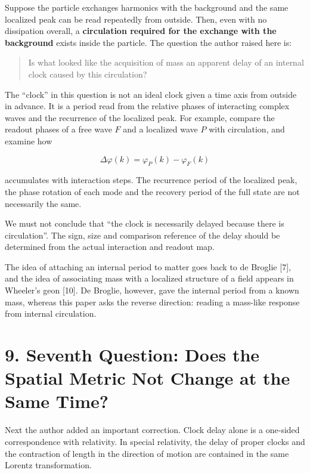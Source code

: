 \documentclass[
  a4paper,
]{article}
\begin{document}
Suppose the particle exchanges harmonics with the background and the
same localized peak can be read repeatedly from outside. Then, even with
no dissipation overall, a \textbf{circulation required for the exchange
with the background} exists inside the particle. The question the author
raised here is:

\begin{quote}
Is what looked like the acquisition of mass an apparent delay of an
internal clock caused by this circulation?
\end{quote}

The ``clock'' in this question is not an ideal clock given a time axis
from outside in advance. It is a period read from the relative phases of
interacting complex waves and the recurrence of the localized peak. For
example, compare the readout phases of a free wave \(F\) and a localized
wave \(P\) with circulation, and examine how

\[
\Delta\varphi(k)=\varphi_P(k)-\varphi_F(k)
\]

accumulates with interaction steps. The recurrence period of the
localized peak, the phase rotation of each mode and the recovery period
of the full state are not necessarily the same.

We must not conclude that ``the clock is necessarily delayed because
there is circulation''. The sign, size and comparison reference of the
delay should be determined from the actual interaction and readout map.

The idea of attaching an internal period to matter goes back to de
Broglie {[}7{]}, and the idea of associating mass with a localized
structure of a field appears in Wheeler's geon {[}10{]}. De Broglie,
however, gave the internal period from a known mass, whereas this paper
asks the reverse direction: reading a mass-like response from internal
circulation.

\section{9. Seventh Question: Does the Spatial Metric Not Change at the
Same
Time?}\label{seventh-question-does-the-spatial-metric-not-change-at-the-same-time}

Next the author added an important correction. Clock delay alone is a
one-sided correspondence with relativity. In special relativity, the
delay of proper clocks and the contraction of length in the direction of
motion are contained in the same Lorentz transformation.
\end{document}
